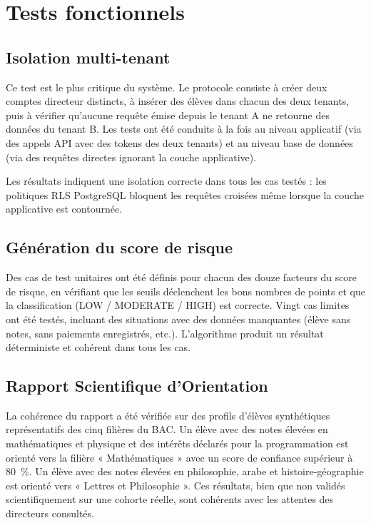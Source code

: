 \documentclass[12pt,a4paper,oneside]{report}
\begin{document}
\section{Tests fonctionnels}

\subsection{Isolation multi-tenant}

Ce test est le plus critique du système. Le protocole consiste à créer deux comptes directeur distincts, à insérer des élèves dans chacun des deux tenants, puis à vérifier qu'aucune requête émise depuis le tenant A ne retourne des données du tenant B. Les tests ont été conduits à la fois au niveau applicatif (via des appels API avec des tokens des deux tenants) et au niveau base de données (via des requêtes directes ignorant la couche applicative).

Les résultats indiquent une isolation correcte dans tous les cas testés : les politiques RLS PostgreSQL bloquent les requêtes croisées même lorsque la couche applicative est contournée.

\subsection{Génération du score de risque}

Des cas de test unitaires ont été définis pour chacun des douze facteurs du score de risque, en vérifiant que les seuils déclenchent les bons nombres de points et que la classification (LOW / MODERATE / HIGH) est correcte. Vingt cas limites ont été testés, incluant des situations avec des données manquantes (élève sans notes, sans paiements enregistrés, etc.). L'algorithme produit un résultat déterministe et cohérent dans tous les cas.

\subsection{Rapport Scientifique d'Orientation}

La cohérence du rapport a été vérifiée sur des profils d'élèves synthétiques représentatifs des cinq filières du BAC. Un élève avec des notes élevées en mathématiques et physique et des intérêts déclarés pour la programmation est orienté vers la filière « Mathématiques » avec un score de confiance supérieur à 80~\%. Un élève avec des notes élevées en philosophie, arabe et histoire-géographie est orienté vers « Lettres et Philosophie ». Ces résultats, bien que non validés scientifiquement sur une cohorte réelle, sont cohérents avec les attentes des directeurs consultés.
\end{document}
